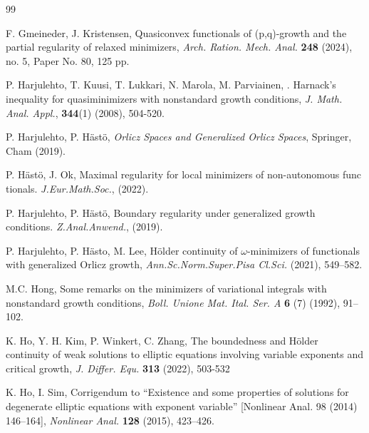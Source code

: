 \documentclass[10pt,reqno]{amsart}
\newcommand *\w{^\wedge}
\theoremstyle{definition}
\numberwithin{equation}{section}
\begin{document}
\begin{thebibliography}{99}
{
F. Gmeineder, J. Kristensen,
Quasiconvex functionals of (p,q)-growth and the partial regularity of relaxed minimizers,
{\it Arch. Ration. Mech. Anal.} \textbf{248} (2024), no. 5, Paper No. 80, 125 pp.



P. Harjulehto, T. Kuusi, T. Lukkari, N. Marola, M. Parviainen, . Harnack's inequality for quasiminimizers with nonstandard growth conditions, \textit{J. Math. Anal. Appl.}, \textbf{344}(1) (2008), 504-520.

P. Harjulehto, P. Hästö, 
{\it Orlicz Spaces and Generalized Orlicz Spaces}, 
Springer, Cham (2019).

 P. Hästö, J. Ok, Maximal regularity for local minimizers of non-autonomous func
tionals. \textit{J.Eur.Math.Soc.}, (2022).

P. Harjulehto, P. Hästö, Boundary regularity under generalized growth conditions.
\textit{Z.Anal.Anwend.}, (2019).

P. Harjulehto, P. Hästo,  M. Lee, Hölder continuity of $\omega $-minimizers of functionals with generalized Orlicz growth,  \textit{Ann.Sc.Norm.Super.Pisa Cl.Sci.} (2021), 549--582.

M.C. Hong, 
Some remarks on the minimizers of variational integrals with nonstandard growth conditions, 
{\it Boll. Unione Mat. Ital. Ser. A} \textbf{6} (7) (1992), 91–102.

K. Ho, Y. H. Kim, P. Winkert, C. Zhang, The boundedness and Hölder continuity of weak solutions to elliptic equations involving variable exponents and critical growth, \textit{ J. Differ. Equ.} \textbf{313} (2022), 503-532

K. Ho, I. Sim, 
Corrigendum to ``Existence and some properties of solutions for degenerate elliptic equations with exponent variable'' [Nonlinear Anal. 98 (2014) 146–164], 
{\it Nonlinear Anal.} \textbf{128} (2015), 423–426.


}
\end{thebibliography}
\end{document}
